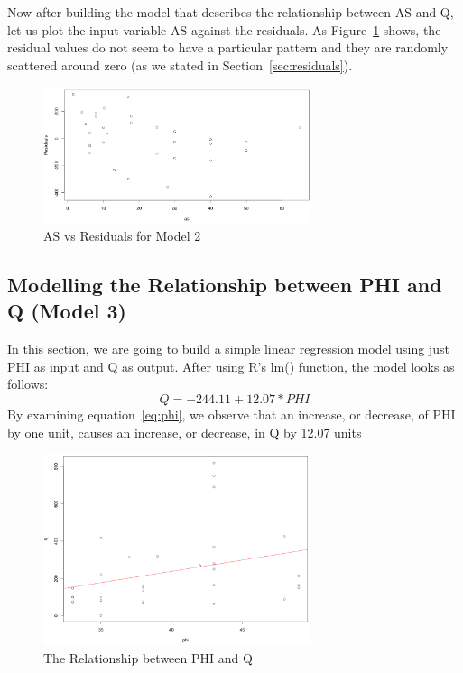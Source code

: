 \documentclass[a4paper,12pt, english]{article}
\begin{document}
Now after building the model that describes the relationship between AS and Q, let us plot the input variable AS against the residuals. As Figure~\ref{fig:mod2-resid1} shows, the residual values do not seem to have a particular pattern and they are randomly scattered around zero (as we stated in Section~\ref{sec:residuals}).

\begin{figure}[H]
  \centering
  \includegraphics[width=0.6986\textwidth]{mod2-resid1}
  \caption{AS vs Residuals for Model 2}
  \label{fig:mod2-resid1}
\end{figure}

\subsection{Modelling the Relationship between PHI and Q (Model 3)} \label{sec:phimodel}
In this section, we are going to build a simple linear regression model using just PHI as input and Q as output. After using R's lm() function, the model looks as follows:\\
\begin{equation}
\label{eq:phi}
Q =  -244.11    +    12.07*PHI 
\end{equation}       
By examining equation~\ref{eq:phi}, we observe that an increase, or decrease, of PHI by one unit, causes an increase, or decrease, in Q by 12.07 units

\begin{figure}[H]
  \centering
  \includegraphics[width=0.6986\textwidth]{phi-line}
  \caption{The Relationship between PHI and Q}
  \label{fig:phi-line}
\end{figure}
\end{document}
